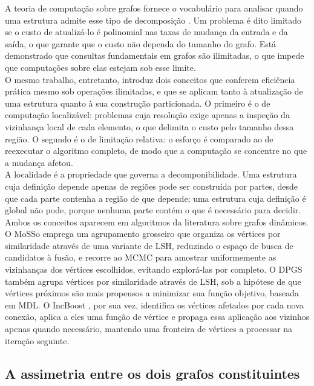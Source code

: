 A teoria de computação sobre grafos fornece o vocabulário para analisar quando uma estrutura admite esse tipo de decomposição \cite{incremental-computations}. Um problema é dito limitado se o custo de atualizá-lo é polinomial nas taxas de mudança da entrada e da saída, o que garante que o custo não dependa do tamanho do grafo. Está demonstrado que consultas fundamentais em grafos são ilimitadas, o que impede que computações sobre elas estejam sob esse limite.\\

O mesmo trabalho, entretanto, introduz dois conceitos que conferem eficiência prática mesmo sob operações ilimitadas, e que se aplicam tanto à atualização de uma estrutura quanto à sua construção particionada. O primeiro é o de computação localizável: problemas cuja resolução exige apenas a inspeção da vizinhança local de cada elemento, o que delimita o custo pelo tamanho dessa região. O segundo é o de limitação relativa: o esforço é comparado ao de reexecutar o algoritmo completo, de modo que a computação se concentre no que a mudança afetou.\\

A localidade é a propriedade que governa a decomponibilidade. Uma estrutura cuja definição depende apenas de regiões pode ser construída por partes, desde que cada parte contenha a região de que depende; uma estrutura cuja definição é global não pode, porque nenhuma parte contém o que é necessário para decidir. Ambos os conceitos aparecem em algoritmos da literatura sobre grafos dinâmicos. O \ac{MoSSo} \cite{mosso} emprega um agrupamento grosseiro que organiza os vértices por similaridade através de uma variante de \ac{LSH}, reduzindo o espaço de busca de candidatos à fusão, e recorre ao \ac{MCMC} para amostrar uniformemente as vizinhanças dos vértices escolhidos, evitando explorá-las por completo. O \ac{DPGS} \cite{dpgs} também agrupa vértices por similaridade através de \ac{LSH}, sob a hipótese de que vértices próximos são mais propensos a minimizar sua função objetivo, baseada em \ac{MDL}. O IncBoost \cite{inc-boost}, por sua vez, identifica os vértices afetados por cada nova conexão, aplica a eles uma função de vértice e propaga essa aplicação aos vizinhos apenas quando necessário, mantendo uma fronteira de vértices a processar na iteração seguinte.\\

\subsection{A assimetria entre os dois grafos constituintes\label{sec:asymmetry}}

